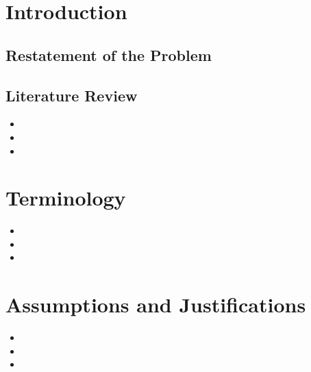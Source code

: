 \documentclass[12pt,a4paper,titlepage]{article}
\begin{document}
\title{}
\date{}
\maketitle

\tableofcontents

\newpage

\section{Introduction}
\label{sec:introduction}

\subsection{Restatement of the Problem}
\label{sec:restatement-of-the-problem}

\subsection{Literature Review}
\label{sec:literature-review}

\begin{itemize}
    \item
    \item
    \item
\end{itemize}

\section{Terminology}
\label{sec:terminology}

\begin{itemize}
    \item
    \item
    \item
\end{itemize}

\section{Assumptions and Justifications}
\label{sec:assumptions-and-justifications}

\begin{itemize}
    \item
    \item
    \item
\end{itemize}

\section{}
\label{sec:}
\end{document}
